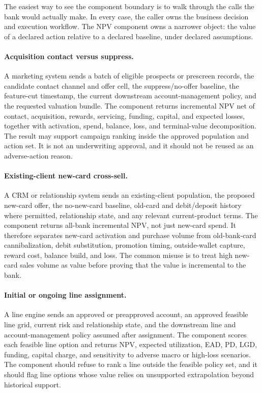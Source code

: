 \documentclass[11pt]{article}
\newcommand{\1}{\mathbf{1}}
\begin{document}
The easiest way to see the component boundary is to walk through the calls the
bank would actually make. In every case, the caller owns the business decision
and execution workflow. The NPV component owns a narrower object: the value of a
declared action relative to a declared baseline, under declared assumptions.

\paragraph{Acquisition contact versus suppress.}
A marketing system sends a batch of eligible prospects or prescreen records,
the candidate contact channel and offer cell, the suppress/no-offer baseline,
the feature-cut timestamp, the current downstream account-management policy,
and the requested valuation bundle. The component returns incremental NPV net
of contact, acquisition, rewards, servicing, funding, capital, and expected
losses, together with activation, spend, balance, loss, and terminal-value
decomposition. The result may support campaign ranking inside the approved
population and action set. It is not an underwriting approval, and it should not
be reused as an adverse-action reason.

\paragraph{Existing-client new-card cross-sell.}
A CRM or relationship system sends an existing-client population, the proposed
new-card offer, the no-new-card baseline, old-card and debit/deposit history
where permitted, relationship state, and any relevant current-product terms.
The component returns all-bank incremental NPV, not just new-card spend. It
therefore separates new-card activation and purchase volume from old-bank-card
cannibalization, debit substitution, promotion timing, outside-wallet capture,
reward cost, balance build, and loss. The common misuse is to treat high
new-card sales volume as value before proving that the value is incremental to
the bank.

\paragraph{Initial or ongoing line assignment.}
A line engine sends an approved or preapproved account, an approved feasible
line grid, current risk and relationship state, and the downstream line and
account-management policy assumed after assignment. The component scores each
feasible line option and returns NPV, expected utilization, EAD, PD, LGD,
funding, capital charge, and sensitivity to adverse macro or high-loss
scenarios. The component should refuse to rank a line outside the feasible
policy set, and it should flag line options whose value relies on unsupported
extrapolation beyond historical support.
\end{document}
